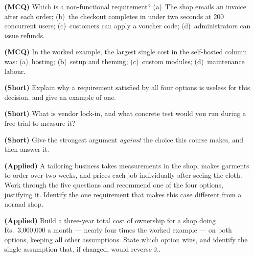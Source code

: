 \begin{reviewq}
  \item \textbf{(MCQ)} Which is a non-functional requirement? (a)~The shop
        emails an invoice after each order; (b)~the checkout completes in under
        two seconds at 200 concurrent users; (c)~customers can apply a voucher
        code; (d)~administrators can issue refunds.
  \item \textbf{(MCQ)} In the worked example, the largest single cost in the
        self-hosted column was: (a)~hosting; (b)~setup and theming; (c)~custom
        modules; (d)~maintenance labour.
  \item \textbf{(Short)} Explain why a requirement satisfied by all four options
        is useless for this decision, and give an example of one.
  \item \textbf{(Short)} What is vendor lock-in, and what concrete test would
        you run during a free trial to measure it?
  \item \textbf{(Short)} Give the strongest argument \emph{against} the choice
        this course makes, and then answer it.
  \item \textbf{(Applied)} A tailoring business takes measurements in the shop,
        makes garments to order over two weeks, and prices each job
        individually after seeing the cloth. Work through the five questions
        and recommend one of the four options, justifying it. Identify the one
        requirement that makes this case different from a normal shop.
  \item \textbf{(Applied)} Build a three-year total cost of ownership for a
        shop doing Rs.~3{,}000{,}000 a month --- nearly four times the worked
        example --- on both options, keeping all other assumptions. State which
        option wins, and identify the single assumption that, if changed, would
        reverse it.
\end{reviewq}
